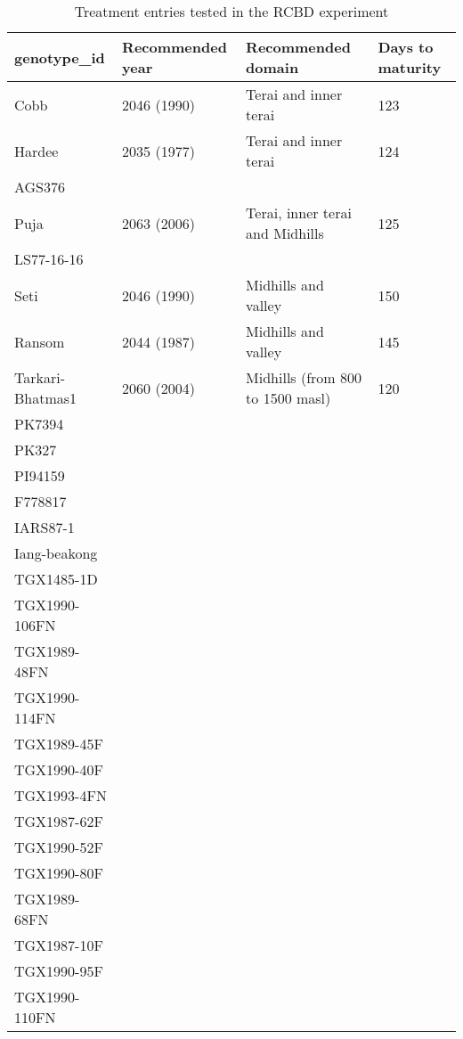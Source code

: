 \documentclass[
]{article}
\begin{document}
\begin{table}[!h]

\caption{\label{tab:treat-ent}Treatment entries tested in the RCBD experiment}
\centering
\fontsize{10}{12}\selectfont
\begin{tabular}[t]{llll}
\toprule
genotype\_id & Recommended year & Recommended domain & Days to maturity\\
\midrule
\rowcolor{gray!6}  Cobb & 2046 (1990) & Terai and inner terai & 123\\
Hardee & 2035 (1977) & Terai and inner terai & 124\\
\rowcolor{gray!6}  AGS376 &  &  & \\
Puja & 2063 (2006) & Terai, inner terai and Midhills & 125\\
\rowcolor{gray!6}  LS77-16-16 &  &  & \\
\addlinespace
Seti & 2046 (1990) & Midhills and valley & 150\\
\rowcolor{gray!6}  Ransom & 2044 (1987) & Midhills and valley & 145\\
Tarkari-Bhatmas1 & 2060 (2004) & Midhills (from 800 to 1500 masl) & 120\\
\rowcolor{gray!6}  PK7394 &  &  & \\
PK327 &  &  & \\
\addlinespace
\rowcolor{gray!6}  PI94159 &  &  & \\
F778817 &  &  & \\
\rowcolor{gray!6}  IARS87-1 &  &  & \\
Iang-beakong &  &  & \\
\rowcolor{gray!6}  TGX1485-1D &  &  & \\
\addlinespace
TGX1990-106FN &  &  & \\
\rowcolor{gray!6}  TGX1989-48FN &  &  & \\
TGX1990-114FN &  &  & \\
\rowcolor{gray!6}  TGX1989-45F &  &  & \\
TGX1990-40F &  &  & \\
\addlinespace
\rowcolor{gray!6}  TGX1993-4FN &  &  & \\
TGX1987-62F &  &  & \\
\rowcolor{gray!6}  TGX1990-52F &  &  & \\
TGX1990-80F &  &  & \\
\rowcolor{gray!6}  TGX1989-68FN &  &  & \\
\addlinespace
TGX1987-10F &  &  & \\
\rowcolor{gray!6}  TGX1990-95F &  &  & \\
TGX1990-110FN &  &  & \\
\bottomrule
\end{tabular}
\end{table}
\end{document}
